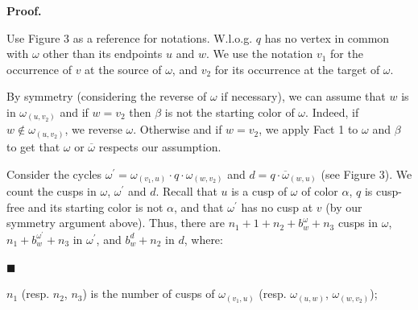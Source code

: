 \documentclass[10pt,a4paper]{amsart}
\begin{document}
 
 
 
\par\medskip\noindent\textbf{Proof.}\par
 
 
Use Figure 3 as a reference for notations. W.l.o.g. $q$ has no vertex in common with $\omega$ other than its endpoints $u$ and $w$. We use the notation $v_{1}$ for the occurrence of $v$ at the source of $\omega$, and $v_{2}$ for its occurrence at the target of $\omega$.\par
 
 
 
By symmetry (considering the reverse of $\omega$ if necessary), we can assume that $w$ is in ${\omega}_{(u,v_{2})}$ and if $w=v_{2}$ then $\beta$ is not the starting color of $\omega$. Indeed, if $w\notin{\omega}_{(u,v_{2})}$, we reverse $\omega$. Otherwise and if $w=v_{2}$, we apply Fact 1 to $\omega$ and $\beta$ to get that $\omega$ or $\overline{\omega}$ respects our assumption.\par
 
 
 
Consider the cycles $\omega^{\prime}={\omega}_{(v_{1},u)}\cdot q\cdot{\omega}_{(w,v_{2})}$ and $d=q\cdot{\overline{\omega}}_{(w,u)}$ (see Figure 3). We count the cusps in $\omega$, $\omega^{\prime}$ and $d$. Recall that $u$ is a cusp of $\omega$ of color $\alpha$, $q$ is cusp-free and its starting color is not $\alpha$, and that $\omega^{\prime}$ has no cusp at $v$ (by our symmetry argument above). Thus, there are $n_{1}+1+n_{2}+b^{\omega}_{w}+n_{3}$ cusps in $\omega$, $n_{1}+b^{\omega^{\prime}}_{w}+n_{3}$ in $\omega^{\prime}$, and $b^{d}_{w}+n_{2}$ in $d$, where:\par
  
\par\noindent  $\blacksquare$ 
 
$n_{1}$ (resp. $n_{2}$, $n_{3}$) is the number of cusps of ${\omega}_{(v_{1},u)}$ (resp. ${\omega}_{(u,w)}$, ${\omega}_{(w,v_{2})}$);\par
 
 
\end{document}
